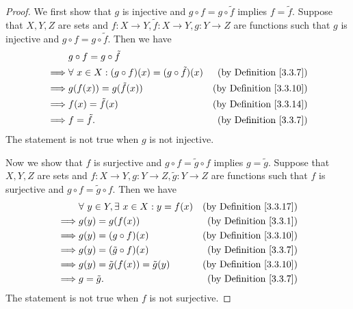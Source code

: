 \begin{proof}
    We first show that \(g\) is injective and \(g \circ f = g \circ \tilde{f}\) implies \(f = \tilde{f}\).
    Suppose that \(X, Y, Z\) are sets and \(f : X \to Y, \tilde{f} : X \to Y, g : Y \to Z\) are functions such that \(g\) is injective and \(g \circ f = g \circ \tilde{f}\).
    Then we have
    \begin{align*}
                 & g \circ f = g \circ \tilde{f}                                                                    \\
        \implies & \forall\ x \in X : (g \circ f)(x) = (g \circ \tilde{f})(x) & \text{(by Definition \ref{3.3.7})}  \\
        \implies & g(f(x)) = g(\tilde{f}(x))                                  & \text{(by Definition \ref{3.3.10})} \\
        \implies & f(x) = \tilde{f}(x)                                        & \text{(by Definition \ref{3.3.14})} \\
        \implies & f = \tilde{f}.                                             & \text{(by Definition \ref{3.3.7})}
    \end{align*}
    The statement is not true when \(g\) is not injective.

    Now we show that \(f\) is surjective and \(g \circ f = \tilde{g} \circ f\) implies \(g = \tilde{g}\).
    Suppose that \(X, Y, Z\) are sets and \(f : X \to Y, g : Y \to Z, \tilde{g} : Y \to Z\) are functions such that \(f\) is surjective and \(g \circ f = \tilde{g} \circ f\).
    Then we have
    \begin{align*}
                 & \forall\ y \in Y, \exists\ x \in X : y = f(x) & \text{(by Definition \ref{3.3.17})} \\
        \implies & g(y) = g(f(x))                                & \text{(by Definition \ref{3.3.1})}  \\
        \implies & g(y) = (g \circ f)(x)                         & \text{(by Definition \ref{3.3.10})} \\
        \implies & g(y) = (\tilde{g} \circ f)(x)                 & \text{(by Definition \ref{3.3.7})}  \\
        \implies & g(y) = \tilde{g}(f(x)) = \tilde{g}(y)         & \text{(by Definition \ref{3.3.10})} \\
        \implies & g = \tilde{g}.                                & \text{(by Definition \ref{3.3.7})}
    \end{align*}
    The statement is not true when \(f\) is not surjective.
\end{proof}

